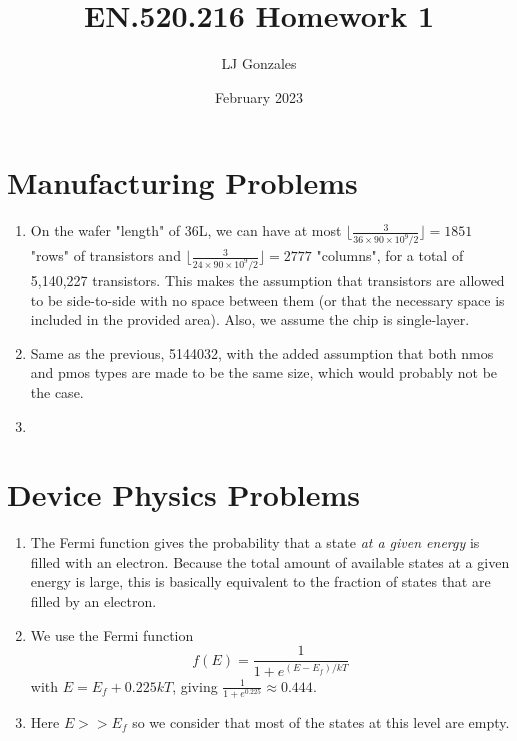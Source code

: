 \documentclass{article}
\title{EN.520.216 Homework 1}
\author{LJ Gonzales}
\date{February 2023}
\begin{document}
\maketitle
\section{Manufacturing Problems}
\begin{prob}
\begin{enumerate} 
	\item On the wafer "length" of 36L, we can have at most $\lfloor\frac{3}{36\times90\times10^9/2}\rfloor=1851$ "rows" of transistors and $\lfloor\frac{3}{24\times90\times10^9/2}\rfloor=2777$ "columns", for a total of 5,140,227 transistors. This makes the assumption that transistors are allowed to be side-to-side with no space between them (or that the necessary space is included in the provided area). Also, we assume the chip is single-layer.
\item Same as the previous, 5144032, with the added assumption that both nmos and pmos types are made to be the same size, which would probably not be the case.
\item 
\end{enumerate}
\end{prob}

\section{Device Physics Problems}
\begin{prob}
\begin{enumerate}
    \item The Fermi function gives the probability that a state \emph{at a given energy} is filled with an electron. Because the total amount of available states at a given energy is large, this is basically equivalent to the fraction of states that are filled by an electron.
    \item We use the Fermi function \[f(E)=\frac{1}{1+e^{(E-E_f)/kT}}\] with $E=E_f+0.225kT$, giving $\frac{1}{1+e^{0.225}}\approx0.444$.
    \item Here $E>>E_f$ so we consider that most of the states at this level are empty.
\end{enumerate}
\end{prob}
\end{document}
